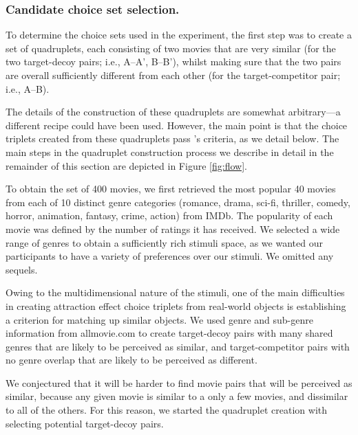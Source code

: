 \documentclass[12pt, a4paper]{article}
\begin{document}
\subsubsection*{Candidate choice set selection.}

To determine the choice sets used in the experiment, the first step was to create a set of quadruplets, each consisting of two movies that are very similar (for the two target-decoy pairs; i.e., A--A', B--B'), whilst making sure that the two pairs are overall sufficiently different from each other (for the target-competitor pair; i.e., A--B).

The details of the construction of these quadruplets are somewhat arbitrary---a different recipe could have been used. However, the main point is that the choice triplets created from these quadruplets pass \citeauthor{Huber2014}'s \citeyear{Huber2014} criteria, as we detail below. The main steps in the quadruplet construction process we describe in detail in the remainder of this section are depicted in Figure \ref{fig:flow}.


To obtain the set of 400 movies, we first retrieved the most popular 40 movies from each of 10 distinct genre categories (romance, drama, sci-fi, thriller, comedy, horror, animation, fantasy, crime, action) from IMDb. The popularity of each movie was defined by the number of ratings it has received. We selected a wide range of genres to obtain a sufficiently rich stimuli space, as we wanted our participants to have a variety of preferences over our stimuli. We omitted any sequels.

Owing to the multidimensional nature of the stimuli, one of the main difficulties in creating attraction effect choice triplets from real-world objects is establishing a criterion for matching up similar objects. We used genre and sub-genre information from allmovie.com to create target-decoy pairs with many shared genres that are likely to be perceived as similar, and target-competitor pairs with no genre overlap that are likely to be perceived as different.

We conjectured that it will be harder to find movie pairs that will be perceived as similar, because any given movie is similar to a only a few movies, and dissimilar to all of the others. For this reason, we started the quadruplet creation with selecting potential target-decoy pairs.
\end{document}
